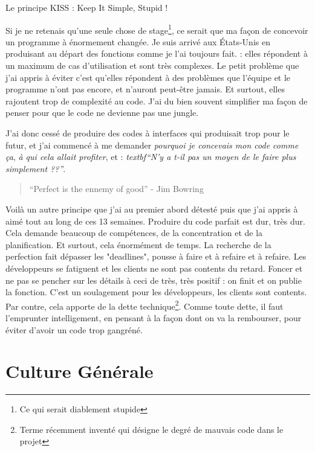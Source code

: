 \begin{center}Le principe KISS : Keep It Simple, Stupid !\end{center}

Si je ne retenais qu'une seule chose de stage\footnote{Ce qui serait diablement stupide}, ce serait que ma façon de concevoir un programme à énormement changée. Je suis arrivé aux États-Unis en produisant au départ des fonctions comme je l'ai toujours fait. : elles répondent à un maximum de cas d'utilisation et sont très complexes. Le petit problème que j'ai appris à éviter c'est qu'elles répondent à des problèmes que l'équipe et le programme n'ont pas encore, et n'auront peut-être jamais. Et surtout, elles rajoutent trop de complexité au code. J'ai du bien souvent simplifier ma façon de penser pour que le code ne devienne pas une jungle.

J'ai donc cessé de produire des codes à interfaces qui produisait trop pour le futur, et j'ai commencé à me demander \emph{pourquoi je concevais mon code comme ça}, \emph{à qui cela allait profiter}, et : \emph{textbf{``N'y a t-il pas un moyen de le faire plus simplement ??''}}.

\begin{quote}
``Perfect is the ennemy of good'' - Jim Bowring
\end{quote}

Voilà un autre principe que j'ai au premier abord détesté puis que j'ai appris à aimé tout au long de ces 13 semaines. Produire du code parfait est dur, très dur. Cela demande beaucoup de compétences, de la concentration et de la planification. Et surtout, cela énormément de temps. La recherche de la perfection fait dépasser les "deadlines", pousse à faire et à refaire et à refaire. Les développeurs se fatiguent et les clients ne sont pas contents du retard. Foncer et ne pas se pencher sur les détails à ceci de très, très positif : on finit et on publie la fonction. C'est un soulagement pour les développeurs, les clients sont contents. Par contre, cela apporte de la dette technique\footnote{Terme récemment inventé qui désigne le degré de mauvais code dans le projet}. Comme toute dette, il faut l'emprunter intelligement, en pensant à la façon dont on va la rembourser, pour éviter d'avoir un code trop gangréné.

\section{Culture Générale}
